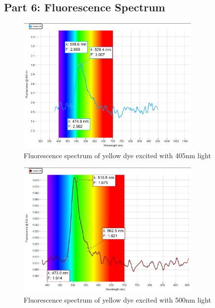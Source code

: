 \subsection{Part 6: Fluorescence Spectrum}
\begin{figure}
    \centering
    \includegraphics[width=0.8\textwidth]{Results/fluourescence_spectrometry/405nm.png}
    \caption{Fluorescence spectrum of yellow dye excited with 405nm light}
    \label{fig:fluorescence}
\end{figure}

\begin{figure}
    \centering
    \includegraphics[width=0.8\textwidth]{Results/fluourescence_spectrometry/500nm.png}
    \caption{Fluorescence spectrum of yellow dye excited with 500nm light}
    \label{fig:fluorescence2}
\end{figure}